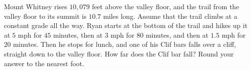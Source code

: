 Mount Whitney rises $10{,}079$ feet above the valley floor, and the trail from the valley floor to its summit is $10.7$ miles long. Assume that the trail climbs at a constant grade all the way. Ryan starts at the bottom of the trail and hikes up it at $5$ mph for $45$ minutes, then at $3$ mph for $80$ minutes, and then at $1.5$ mph for $20$ minutes. Then he stops for lunch, and one of his Clif bars falls over a cliff, straight down to the valley floor. How far does the Clif bar fall? Round your answer to the nearest foot.
